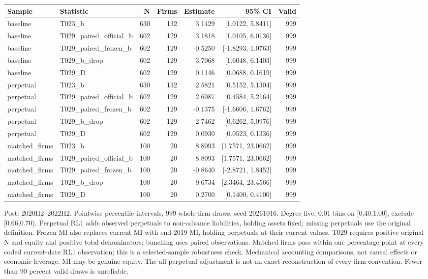 \begin{table}[!htbp]\centering\scriptsize
\begin{tabular}{llrrrrr}
\toprule
Sample & Statistic & N & Firms & Estimate & 95\% CI & Valid \\
\midrule
baseline & T023\_b & 630 & 132 & 3.1429 & [1.0122, 5.8411] & 999 \\
baseline & T029\_paired\_official\_b & 602 & 129 & 3.1818 & [1.0105, 6.0136] & 999 \\
baseline & T029\_paired\_frozen\_b & 602 & 129 & -0.5250 & [-1.8293, 1.0763] & 999 \\
baseline & T029\_b\_drop & 602 & 129 & 3.7068 & [1.6048, 6.1403] & 999 \\
baseline & T029\_D & 602 & 129 & 0.1146 & [0.0688, 0.1619] & 999 \\
perpetual & T023\_b & 630 & 132 & 2.5821 & [0.5152, 5.1304] & 999 \\
perpetual & T029\_paired\_official\_b & 602 & 129 & 2.6087 & [0.4584, 5.2164] & 999 \\
perpetual & T029\_paired\_frozen\_b & 602 & 129 & -0.1375 & [-1.6606, 1.6762] & 999 \\
perpetual & T029\_b\_drop & 602 & 129 & 2.7462 & [0.6262, 5.0976] & 999 \\
perpetual & T029\_D & 602 & 129 & 0.0930 & [0.0523, 0.1336] & 999 \\
matched\_firms & T023\_b & 100 & 20 & 8.8093 & [1.7571, 23.0662] & 999 \\
matched\_firms & T029\_paired\_official\_b & 100 & 20 & 8.8093 & [1.7571, 23.0662] & 999 \\
matched\_firms & T029\_paired\_frozen\_b & 100 & 20 & -0.8640 & [-2.8721, 1.8452] & 999 \\
matched\_firms & T029\_b\_drop & 100 & 20 & 9.6734 & [2.3464, 23.4566] & 999 \\
matched\_firms & T029\_D & 100 & 20 & 0.2700 & [0.1400, 0.4100] & 999 \\
\bottomrule
\end{tabular}
\par\smallskip\parbox{0.95\linewidth}{\footnotesize Post: 2020H2--2022H2. Pointwise percentile intervals, 999 whole-firm draws, seed 20261016. Degree five, 0.01 bins on [0.40,1.00], exclude [0.66,0.70). Perpetual RL1 adds observed perpetuals to non-advance liabilities, holding assets fixed; missing perpetuals use the original definition. Frozen MI also replaces current MI with end-2019 MI, holding perpetuals at their current values. T029 requires positive original N and equity and positive total denominators; bunching uses paired observations. Matched firms pass within one percentage point at every coded current-date RL1 observation; this is a selected-sample robustness check. Mechanical accounting comparisons, not causal effects or economic leverage. MI may be genuine equity. The all-perpetual adjustment is not an exact reconstruction of every firm convention. Fewer than 90 percent valid draws is unreliable.}
\end{table}

